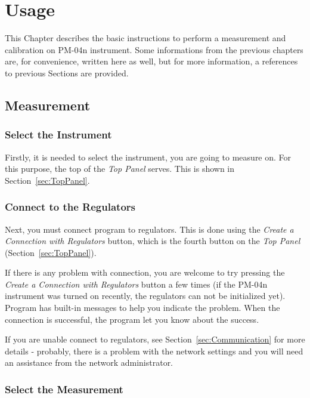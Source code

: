 \documentclass[a4paper,11pt,twoside]{book}
\theoremstyle{named}
\begin{document}
\chapter{Usage}
\label{ch:Usage}

This Chapter describes the basic instructions to perform a measurement and
calibration on PM-04n instrument. Some informations from the previous chapters
are, for convenience, written here as well, but for more information, a
references to previous Sections are provided.  

\section{Measurement}
\label{sec:Measurement}

\subsection{Select the Instrument}

Firstly, it is needed to select the instrument, you are going to measure on.
For this purpose, the top of the \textit{Top Panel} serves. This is shown in
Section~\ref{sec:TopPanel}.

\subsection{Connect to the Regulators}

Next, you must connect program to regulators. This is done using the
\textit{Create a Connection with Regulators} button, which is the fourth button
on the \textit{Top Panel} (Section~\ref{sec:TopPanel}).

If there is any problem with connection, you are welcome to try pressing the
\textit{Create a Connection with Regulators} button a few times (if the PM-04n
instrument was turned on recently, the regulators can not be initialized yet).
Program has built-in messages to help you indicate the problem. When the
connection is successful, the program let you know about the success.

If you are unable connect to regulators, see Section~\ref{sec:Communication} for
more details - probably, there is a problem with the network settings and you will
need an assistance from the network administrator. 

\subsection{Select the Measurement}
\label{sec:SelectMeasurement}
\end{document}
